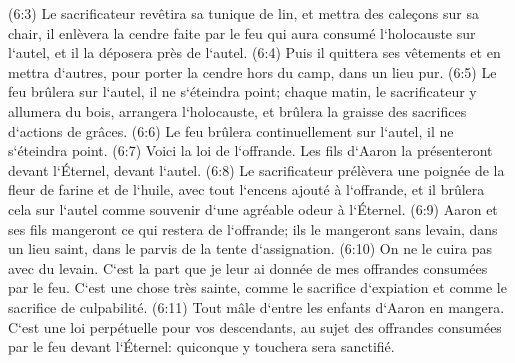 \verse (6:3) Le sacrificateur revêtira sa tunique de lin, et mettra des caleçons sur sa chair, il enlèvera la cendre faite par le feu qui aura consumé l`holocauste sur l`autel, et il la déposera près de l`autel. 
\verse (6:4) Puis il quittera ses vêtements et en mettra d`autres, pour porter la cendre hors du camp, dans un lieu pur. 
\verse (6:5) Le feu brûlera sur l`autel, il ne s`éteindra point; chaque matin, le sacrificateur y allumera du bois, arrangera l`holocauste, et brûlera la graisse des sacrifices d`actions de grâces. 
\verse (6:6) Le feu brûlera continuellement sur l`autel, il ne s`éteindra point. 
\verse (6:7) Voici la loi de l`offrande. Les fils d`Aaron la présenteront devant l`Éternel, devant l`autel. 
\verse (6:8) Le sacrificateur prélèvera une poignée de la fleur de farine et de l`huile, avec tout l`encens ajouté à l`offrande, et il brûlera cela sur l`autel comme souvenir d`une agréable odeur à l`Éternel. 
\verse (6:9) Aaron et ses fils mangeront ce qui restera de l`offrande; ils le mangeront sans levain, dans un lieu saint, dans le parvis de la tente d`assignation. 
\verse (6:10) On ne le cuira pas avec du levain. C`est la part que je leur ai donnée de mes offrandes consumées par le feu. C`est une chose très sainte, comme le sacrifice d`expiation et comme le sacrifice de culpabilité. 
\verse (6:11) Tout mâle d`entre les enfants d`Aaron en mangera. C`est une loi perpétuelle pour vos descendants, au sujet des offrandes consumées par le feu devant l`Éternel: quiconque y touchera sera sanctifié. 

